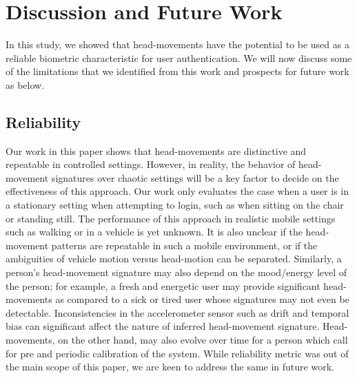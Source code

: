\section{Discussion and Future Work}\label{sec:disc}

In this study, we showed that head-movements have the potential to be used as
a reliable biometric characteristic for user authentication.
We will now discuss some of the limitations that we identified from this work
and prospects for future work as below.

\subsection{Reliability}
Our work in this paper shows that head-movements are distinctive and
repeatable in controlled settings. However, in reality, the behavior of
head-movement signatures over chaotic settings will be a key factor to decide
on the effectiveness of this approach. Our work only evaluates the case when a
user is in a stationary setting when attempting to login, such as when sitting
on the chair or standing still. The performance of this approach in realistic
mobile settings such as walking or in a vehicle is yet unknown. It is also
unclear if the head-movement patterns are repeatable in such a mobile environment, or
if the ambiguities of vehicle motion versus head-motion can be separated. 
Similarly, a person's head-movement signature may also depend on the mood/energy level of
the person; for example, a fresh and energetic user may provide significant
head-movements as compared to a sick or tired user whose signatures may not
even be detectable.
Inconsistencies in the accelerometer sensor such as drift and temporal bias can
significant affect the nature of inferred head-movement signature.
Head-movements, on the other hand, may also evolve over time for a person
which call for pre and periodic calibration of the system.
While reliability metric was out of the main scope of this paper, we are keen
to address the same in future work.

